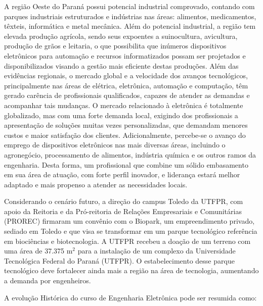 
A região Oeste do Paraná possui potencial industrial comprovado, contando com parques industriais estruturados e indústrias nas áreas: alimentos, medicamentos, têxteis, informática e metal mecânica. Além do potencial industrial, a região tem elevada produção agrícola, sendo seus expoentes a suinocultura, avicultura, produção de grãos e leitaria, o que possibilita que inúmeros dispositivos eletrônicos para automação e recursos informatizados possam ser projetados e disponibilizados visando a gestão mais eficiente destas produções. Além das evidências regionais, o mercado global e a velocidade dos avanços tecnológicos, principalmente nas áreas de elétrica, eletrônica, automação e computação, têm gerado carência de profissionais qualificados, capazes de atender as demandas e acompanhar tais mudanças. O mercado relacionado à eletrônica é totalmente globalizado, mas com uma forte demanda local, exigindo dos profissionais a apresentação de soluções muitas vezes personalizadas, que demandam menores custos e maior satisfação dos clientes. Adicionalmente, percebe-se o avanço do emprego de dispositivos eletrônicos nas mais diversas áreas, incluindo o agronegócio, processamento de alimentos, indústria química e os outros ramos da engenharia. Desta forma, um profissional que combine um sólido embasamento em sua área de atuação, com forte perfil inovador, e liderança estará melhor adaptado e mais propenso a atender as necessidades locais.

Considerando o cenário futuro, a direção do campus Toledo da UTFPR, com apoio da Reitoria e da Pró-reitoria de Relações Empresariais e Comunitárias (PROREC) firmaram um convênio com o Biopark, um empreendimento privado, sediado em Toledo e que visa se transformar em um parque tecnológico referência em biociências e biotecnologia. A UTFPR recebeu a doação de um terreno com uma área de 37.375 m$^2$ para a instalação de um complexo da Universidade Tecnológica Federal do Paraná (UTFPR). O estabelecimento desse parque tecnológico deve fortalecer ainda mais a região na área de tecnologia, aumentando a demanda por engenheiros. 


A evolução Histórica do curso de Engenharia Eletrônica pode ser resumida como:

